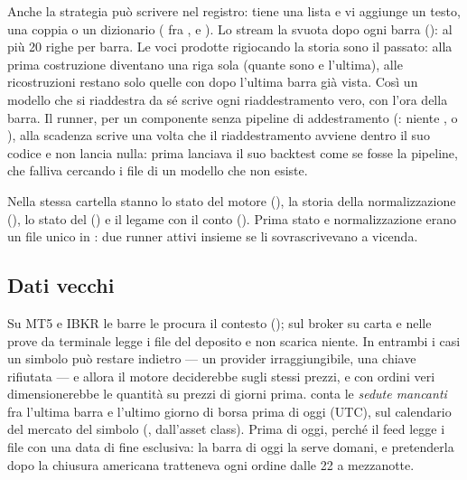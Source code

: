 \noindent
Anche la strategia può scrivere nel registro: tiene una lista
 e vi aggiunge un testo, una coppia  o
un dizionario  ( fra ,
 e ). Lo stream la svuota dopo ogni barra
(): al più \num{20} righe per
barra. Le voci prodotte rigiocando la storia sono il passato: alla prima
costruzione diventano una riga sola (quante sono e l'ultima), alle
ricostruzioni restano solo quelle con  dopo l'ultima barra già
vista. Così un modello che si riaddestra da sé scrive ogni riaddestramento
vero, con l'ora della barra. Il runner, per un componente senza pipeline di
addestramento (: niente ,
 o ), alla scadenza scrive una volta che
il riaddestramento avviene dentro il suo codice e non lancia nulla: prima
lanciava il suo backtest come se fosse la pipeline, che falliva cercando i
file di un modello che non esiste.

\noindent
Nella stessa cartella stanno lo stato del motore (),
la storia della normalizzazione (), lo stato del
 () e il legame con il conto
(). Prima stato e normalizzazione erano un file unico in
: due runner attivi insieme se li sovrascrivevano a vicenda.

\subsection{Dati vecchi}\label{sez:live-dati-vecchi}

Su MT5 e IBKR le barre le procura il contesto (); sul
broker su carta e nelle prove da terminale  legge i
file del deposito e non scarica niente. In entrambi i casi un simbolo può
restare indietro --- un provider irraggiungibile, una chiave rifiutata --- e
allora il motore deciderebbe sugli stessi prezzi, e con ordini veri
dimensionerebbe le quantità su prezzi di giorni prima.  conta le \emph{sedute
mancanti} fra l'ultima barra e l'ultimo giorno di borsa prima di oggi
(UTC), sul calendario del mercato del simbolo (,
dall'asset class). Prima di oggi, perché il feed legge i file con una data
di fine esclusiva: la barra di oggi la serve domani, e pretenderla dopo la
chiusura americana tratteneva ogni ordine dalle 22 a mezzanotte.

